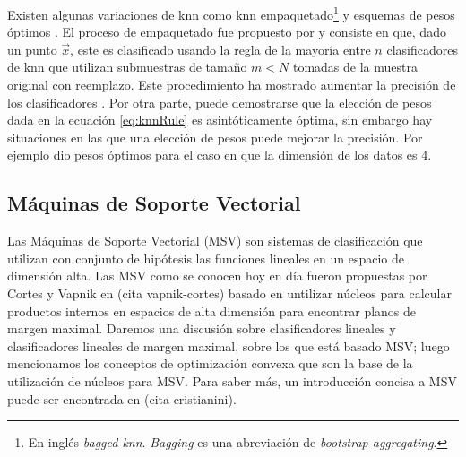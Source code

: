 \documentclass[letterpaper,12pt]{book}
\begin{document}
Existen algunas variaciones de knn como knn empaquetado\footnote{En inglés \textit{bagged knn}. \textit{Bagging} es una abreviación de \textit{bootstrap aggregating}.} \cite{breiman_heuristics_1996, breiman_bagging_1996} y esquemas de pesos óptimos \cite{samworth_optimal_2012}. El proceso de empaquetado fue propuesto por \cite{breiman_heuristics_1996, breiman_bagging_1996} y consiste en que, dado un punto $\vec{x}$, este es clasificado usando la regla de la mayoría entre $n$ clasificadores de knn que utilizan submuestras de tamaño $m<N$ tomadas de la muestra original con reemplazo. Este procedimiento ha mostrado aumentar la precisión de los clasificadores \cite{breiman_bagging_1996}. Por otra parte, puede demostrarse que la elección de pesos dada en la ecuación \ref{eq:knnRule} es asintóticamente óptima, sin embargo hay situaciones en las que una elección de pesos puede mejorar la precisión. Por ejemplo \cite{samworth_optimal_2012} dio pesos óptimos para el caso en que la dimensión de los datos es 4. 

\subsection{Máquinas de Soporte Vectorial}

Las Máquinas de Soporte Vectorial (MSV) son sistemas de clasificación que utilizan con conjunto de hipótesis las funciones lineales en un espacio de dimensión alta. Las MSV como se conocen hoy en día fueron propuestas por Cortes y Vapnik en (cita vapnik-cortes) basado en untilizar núcleos para calcular productos internos en espacios de alta dimensión para encontrar planos de margen maximal. Daremos una discusión sobre clasificadores lineales y clasificadores lineales de margen maximal, sobre los que está basado  MSV; luego mencionamos los conceptos de optimización convexa que son la base de la utilización de núcleos para MSV. Para saber más, un introducción concisa a MSV puede ser encontrada en (cita cristianini).
\end{document}
